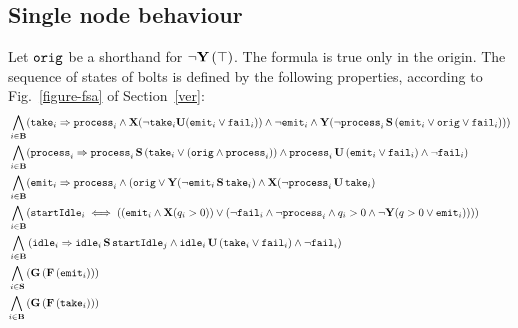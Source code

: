 \subsection*{Single node behaviour}
Let $\mathtt{orig}$ be a shorthand for $\neg\mathbf{Y}\left(\top\right)$.
The formula is true only in the origin.
The sequence of states of bolts is defined by the following properties, according to Fig.~\ref{figure-fsa} of Section~\ref{ver}:
\begin{align*}
 \bigwedge_{
i \in \mathbf{B} } 
&(\ta{i} \Rightarrow 
\p{i} \wedge \mathbf{X}(\lnot \ta{i} \U (\e{i} \lor \f{i})) \land \lnot \e{i}
\land \mathbf{Y}(\lnot \p{i} \, \Snc \, (\e{i}\lor \ori \lor \f{i}))
) \\
%
 \bigwedge_{
i \in \mathbf{B} } 
&(\p{i} \Rightarrow 
\p{i} \, \Snc \, ( \ta{i} \lor (\ori \land \p{i})) \land \p{i} \, \U \, (\e{i} \lor \f{i}) \land \lnot \f{i}) \\
%
 \bigwedge_{
i \in \mathbf{B} } 
&(\e{i} \Rightarrow \p{i} 
\wedge (\ori \lor \mathbf{Y}(\lnot \e{i} \, \Snc \, \ta{i})
\land \mathbf{X}(\lnot \p{i} \, \U \, \ta{i}) \\
%
\bigwedge_{
	\begin{subarray}{c}
	\,i \in \mathbf{B}
	\end{subarray}
}
&(\startid{i} \iff ( (\e{i} \land \mathbf{X}(q_i>0)) \lor (\lnot \f{i} \land \lnot \p{i} \land q_i>0 \land \lnot \mathbf{Y}(q>0 \lor \e{i}) ) ))\\
%
%
\bigwedge_{
	i \in \mathbf{B} } 
&\left( 
\id{i} \Rightarrow 
\id{i} \, \Snc \, \startid{j} \land 
\id{i} \, \U \, (\ta{i} \lor \f{i}) \land \lnot \f{i}
\right)  \\
%
%
\bigwedge_{
i \in \mathbf{S}} \,
&(\G{\F{\e{i}}}) \\
%
%
 \bigwedge_{
\begin{subarray}{c}
i \in \mathbf{B}
\end{subarray}} \,
&(\G{\F{\ta{i}}}) 
%
\end{align*}  




